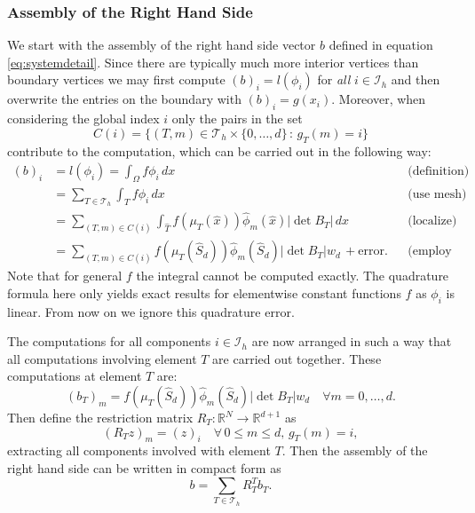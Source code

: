 \documentclass[a4paper,12pt]{article}
\begin{document}
\subsubsection*{Assembly of the Right Hand Side}

We start with the assembly of the right hand side vector $b$
defined in equation \eqref{eq:systemdetail}. Since there are typically much more 
interior vertices than boundary vertices we may first compute $(b)_i = l(\phi_i)$
for {\em all} $i\in\mathcal{I}_h$ and then overwrite the entries on the boundary
with $(b)_i = g(x_i)$. Moreover, when considering the global index $i$
only the pairs in the set
$$C(i) = \{(T,m)\in\mathcal{T}_h\times\{0,\ldots,d\} \,:\, g_T(m)=i\}$$
contribute to the computation, which can be carried out in the following way:
\begin{align*}
(b)_i &= l(\phi_i) = \int_\Omega f \phi_i\,dx &&\text{(definition)} \\
&= \sum_{T\in\mathcal{T}_h} \int_T f \phi_i\,dx &&\text{(use mesh)} \\
&= \sum_{(T,m)\in C(i)} \int_{\hat T} f(\mu_T(\hat x)) \hat\phi_m(\hat x) |\det B_T|\,dx 
&&\text{(localize)} \\
&= \sum_{(T,m)\in C(i)} 
f(\mu_T(\hat S_d)) \hat\phi_m(\hat S_d) |\det B_T| w_d \, + \text{error}. &&\text{(employ quadrature)} 
\end{align*}
Note that for general $f$ the integral cannot be computed exactly. The
quadrature formula here only yields exact results for elementwise constant
functions $f$ as $\phi_i$ is linear. From now on we ignore this quadrature error.

The computations for all components $i\in\mathcal{I}_h$ are now arranged
in such a way that all computations involving element $T$ are carried out together.
These computations at element $T$ are:
\begin{equation}
(b_T)_m =  f(\mu_T(\hat S_d)) \hat\phi_m(\hat S_d) |\det B_T| w_d \quad \forall m=0,\ldots,d .
\label{eq:lambda_volume}
\end{equation}
Then define the restriction matrix 
$R_T : \mathbb{R}^N \to \mathbb{R}^{d+1}$ as
\begin{equation}
(R_T z)_m = (z)_i \quad \forall \,0\leq m \leq d, \,g_T(m)=i,
\end{equation}
extracting all components involved with element $T$. Then
the assembly of the right hand side can be written in compact form as
\begin{equation}
b = \sum_{T\in\mathcal{T}_h} R_T^T b_T .
\label{eq:rhsassembly}
\end{equation}
\end{document}
